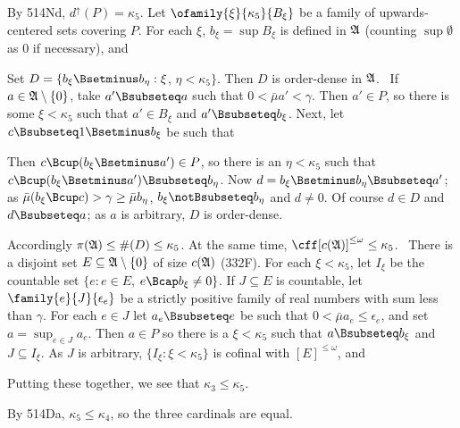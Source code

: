 {\medskip

 By 514Nd, $d^{\uparrow}(P)=\kappa_5$.   Let
$\ofamily{\xi}{\kappa_5}{B_{\xi}}$ be a family of
upwards-centered sets covering $P$.   For each $\xi$,
$b_{\xi}=\sup B_{\xi}$ is defined in $\frak A$ (counting $\sup\emptyset$
as $0$ if necessary), and


\noindent
Set $D=\{b_{\xi}\Bsetminus b_{\eta}:\xi$, $\eta<\kappa_5\}$.   Then $D$
is order-dense in $\frak A$.   \Prf\ If $a\in\frak A\setminus\{0\}$,
take $a'\Bsubseteq a$ such that
$0<\bar\mu a'<\gamma$.   Then $a'\in P$, so there is some $\xi<\kappa_5$
such that $a'\in B_{\xi}$ and
$a'\Bsubseteq b_{\xi}$.   Next, let $c\Bsubseteq 1\Bsetminus b_{\xi}$ be
such that


\noindent Then $c\Bcup(b_{\xi}\Bsetminus a')\in P$, so there is an
$\eta<\kappa_5$ such that
$c\Bcup(b_{\xi}\Bsetminus a')\Bsubseteq b_{\eta}$.   Now
$d=b_{\xi}\Bsetminus b_{\eta}\Bsubseteq a'$;  as
$\bar\mu(b_{\xi}\Bcup c)>\gamma\ge\bar\mu b_{\eta}$,
$b_{\xi}\notBsubseteq b_{\eta}$ and $d\ne 0$.   Of course $d\in D$ and
$d\Bsubseteq a$;  as $a$ is arbitrary, $D$ is order-dense.\ \Qed

Accordingly $\pi(\frak A)\le\#(D)\le\kappa_5$.   At the same time,
$\cff[c(\frak A)]^{\le\omega}\le\kappa_5$.  \Prf\ There is a disjoint set
$E\subseteq\frak A\setminus\{0\}$ of size $c(\frak A)$ (332F).   For
each $\xi<\kappa_5$, let $I_{\xi}$ be the countable set
$\{e:e\in E$, $e\Bcap b_{\xi}\ne 0\}$.
If $J\subseteq E$ is countable, let $\family{e}{J}{\epsilon_e}$ be a
strictly positive family of real numbers with sum less than $\gamma$.
For each $e\in J$ let $a_e\Bsubseteq e$ be such that
$0<\bar\mu a_e\le\epsilon_e$, and set $a=\sup_{e\in J}a_e$.   Then $a\in
P$ so there is a $\xi<\kappa_5$ such that $a\Bsubseteq b_{\xi}$ and
$J\subseteq I_{\xi}$.   As $J$ is arbitrary, $\{I_{\xi}:\xi<\kappa_5\}$
is cofinal with $[E]^{\le\omega}$, and


Putting these together, we see that $\kappa_3\le\kappa_5$.

\medskip

 By 514Da, $\kappa_5\le\kappa_4$, so the three cardinals
are equal.
}%

